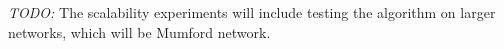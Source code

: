 \emph{\color{blue} TODO: }
The scalability experiments will include testing the algorithm on larger networks, which will be Mumford network.



